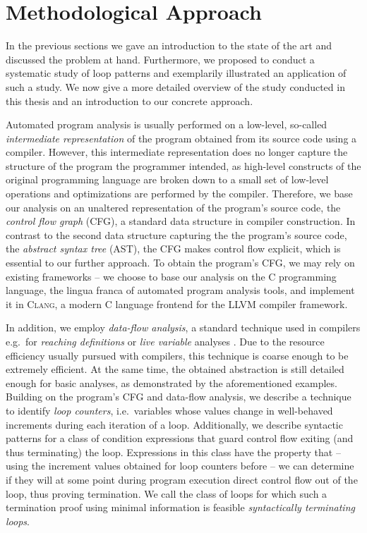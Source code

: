 \section{Methodological Approach}
\label{sec:meth_app}

In the previous sections we gave an introduction to the state of the art and discussed the problem at hand. Furthermore, we proposed to conduct a systematic study of loop patterns and exemplarily illustrated an application of such a study. We now give a more detailed overview of the study conducted in this thesis and an introduction to our concrete approach.

Automated program analysis is usually performed on a low-level, so-called \emph{intermediate representation} of the program obtained from its source code using a compiler. However, this intermediate representation does no longer capture the structure of the program the programmer intended, as high-level constructs of the original programming language are broken down to a small set of low-level operations and optimizations are performed by the compiler. Therefore, we base our analysis on an unaltered representation of the program's source code, the \emph{control flow graph} (CFG), a standard data structure in compiler construction. In contrast to the second data structure capturing the the program's source code, the \emph{abstract syntax tree} (AST), the CFG makes control flow explicit, which is essential to our further approach. To obtain the program's CFG, we may rely on existing frameworks -- we choose to base our analysis on the C programming language, the lingua franca of automated program analysis tools, and implement it in \textsc{Clang}, a modern C language frontend for the \textsc{LLVM} compiler framework.

In addition, we employ \emph{data-flow analysis}, a standard technique used in compilers e.g.\ for \emph{reaching definitions} or \emph{live variable} analyses \cite{DBLP:books/aw/AhoSU86}. Due to the resource efficiency usually pursued with compilers, this technique is coarse enough to be extremely efficient. At the same time, the obtained abstraction is still detailed enough for basic analyses, as demonstrated by the aforementioned examples. Building on the program's CFG and data-flow analysis, we describe a technique to identify \emph{loop counters}, i.e.\ variables whose values change in well-behaved increments during each iteration of a loop. Additionally, we describe syntactic patterns for a class of condition expressions that guard control flow exiting (and thus terminating) the loop. Expressions in this class have the property that -- using the increment values obtained for loop counters before -- we can determine if they will at some point during program execution direct control flow out of the loop, thus proving termination. We call the class of loops for which such a termination proof using minimal information is feasible \emph{syntactically terminating loops}.

